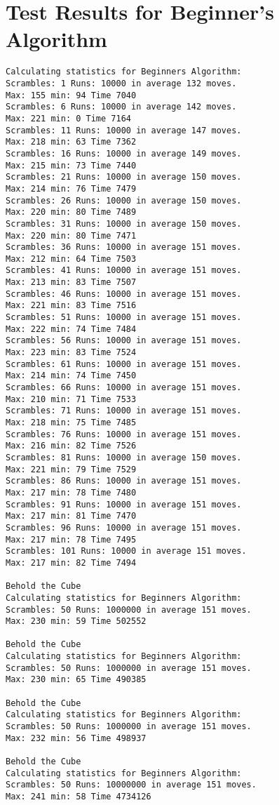 \chapter{Test Results for Beginner's Algorithm}
\label{chap:beginnerResults}
\emptyTop{}
\begin{lstlisting}[breaklines=true, basicstyle=\ttfamily\footnotesize]
Calculating statistics for Beginners Algorithm:
Scrambles: 1 Runs: 10000 in average 132 moves. 
Max: 155 min: 94 Time 7040
Scrambles: 6 Runs: 10000 in average 142 moves. 
Max: 221 min: 0 Time 7164
Scrambles: 11 Runs: 10000 in average 147 moves. 
Max: 218 min: 63 Time 7362
Scrambles: 16 Runs: 10000 in average 149 moves. 
Max: 215 min: 73 Time 7440
Scrambles: 21 Runs: 10000 in average 150 moves. 
Max: 214 min: 76 Time 7479
Scrambles: 26 Runs: 10000 in average 150 moves. 
Max: 220 min: 80 Time 7489
Scrambles: 31 Runs: 10000 in average 150 moves. 
Max: 220 min: 80 Time 7471
Scrambles: 36 Runs: 10000 in average 151 moves. 
Max: 212 min: 64 Time 7503
Scrambles: 41 Runs: 10000 in average 151 moves. 
Max: 213 min: 83 Time 7507
Scrambles: 46 Runs: 10000 in average 151 moves. 
Max: 221 min: 83 Time 7516
Scrambles: 51 Runs: 10000 in average 151 moves. 
Max: 222 min: 74 Time 7484
Scrambles: 56 Runs: 10000 in average 151 moves. 
Max: 223 min: 83 Time 7524
Scrambles: 61 Runs: 10000 in average 151 moves. 
Max: 214 min: 74 Time 7450
Scrambles: 66 Runs: 10000 in average 151 moves. 
Max: 210 min: 71 Time 7533
Scrambles: 71 Runs: 10000 in average 151 moves. 
Max: 218 min: 75 Time 7485
Scrambles: 76 Runs: 10000 in average 151 moves. 
Max: 216 min: 82 Time 7526
Scrambles: 81 Runs: 10000 in average 150 moves. 
Max: 221 min: 79 Time 7529
Scrambles: 86 Runs: 10000 in average 151 moves. 
Max: 217 min: 78 Time 7480
Scrambles: 91 Runs: 10000 in average 151 moves. 
Max: 217 min: 81 Time 7470
Scrambles: 96 Runs: 10000 in average 151 moves. 
Max: 217 min: 78 Time 7495
Scrambles: 101 Runs: 10000 in average 151 moves. 
Max: 217 min: 82 Time 7494

Behold the Cube
Calculating statistics for Beginners Algorithm:
Scrambles: 50 Runs: 1000000 in average 151 moves. 
Max: 230 min: 59 Time 502552

Behold the Cube
Calculating statistics for Beginners Algorithm:
Scrambles: 50 Runs: 1000000 in average 151 moves. 
Max: 230 min: 65 Time 490385

Behold the Cube
Calculating statistics for Beginners Algorithm:
Scrambles: 50 Runs: 1000000 in average 151 moves. 
Max: 232 min: 56 Time 498937

Behold the Cube
Calculating statistics for Beginners Algorithm:
Scrambles: 50 Runs: 10000000 in average 151 moves. 
Max: 241 min: 58 Time 4734126

\end{lstlisting}